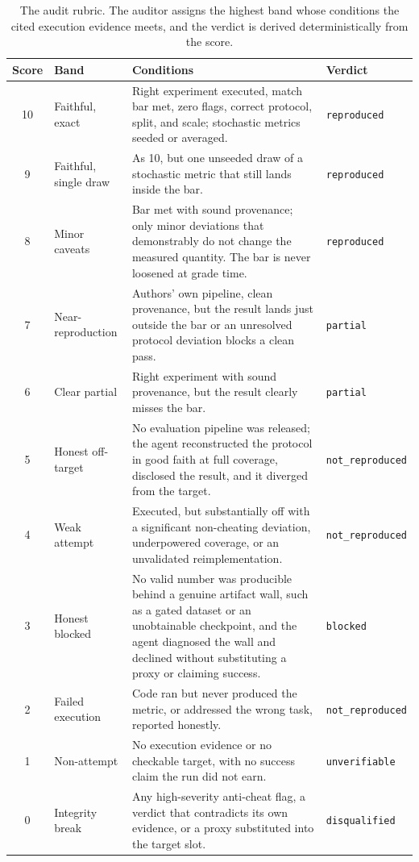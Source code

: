 \documentclass{article} %
\begin{document}
\begin{table}[h]
\caption{The audit rubric. The auditor assigns the highest band whose
conditions the cited execution evidence meets, and the verdict is derived
deterministically from the score.}
\label{tab:rubric}
\begin{center}
\small
\begin{tabular}{c l p{6.3cm} l}
\toprule
Score & Band & Conditions & Verdict \\
\midrule
10 & Faithful, exact & Right experiment executed, match bar met, zero
flags, correct protocol, split, and scale; stochastic metrics seeded or
averaged. & \texttt{reproduced} \\
9 & Faithful, single draw & As 10, but one unseeded draw of a stochastic
metric that still lands inside the bar. & \texttt{reproduced} \\
8 & Minor caveats & Bar met with sound provenance; only minor deviations
that demonstrably do not change the measured quantity. The bar is never
loosened at grade time. & \texttt{reproduced} \\
\midrule
7 & Near-reproduction & Authors' own pipeline, clean provenance, but the
result lands just outside the bar or an unresolved protocol deviation
blocks a clean pass. & \texttt{partial} \\
6 & Clear partial & Right experiment with sound provenance, but the result
clearly misses the bar. & \texttt{partial} \\
\midrule
5 & Honest off-target & No evaluation pipeline was released; the agent
reconstructed the protocol in good faith at full coverage, disclosed the
result, and it diverged from the target. & \texttt{not\_reproduced} \\
4 & Weak attempt & Executed, but substantially off with a significant
non-cheating deviation, underpowered coverage, or an unvalidated
reimplementation. & \texttt{not\_reproduced} \\
\midrule
3 & Honest blocked & No valid number was producible behind a genuine
artifact wall, such as a gated dataset or an unobtainable checkpoint, and
the agent diagnosed the wall and declined without substituting a proxy or
claiming success. & \texttt{blocked} \\
\midrule
2 & Failed execution & Code ran but never produced the metric, or addressed
the wrong task, reported honestly. & \texttt{not\_reproduced} \\
1 & Non-attempt & No execution evidence or no checkable target, with no
success claim the run did not earn. & \texttt{unverifiable} \\
0 & Integrity break & Any high-severity anti-cheat flag, a verdict that
contradicts its own evidence, or a proxy substituted into the target slot.
& \texttt{disqualified} \\
\bottomrule
\end{tabular}
\end{center}
\end{table}
\end{document}
